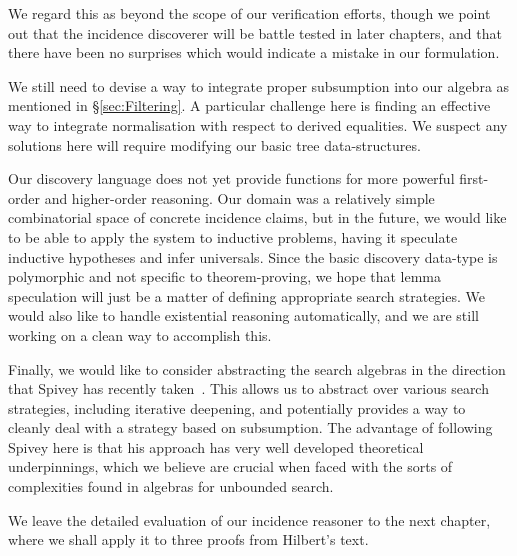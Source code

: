 We regard this as beyond the scope of our verification efforts, though we point out that the incidence discoverer will be battle tested in later chapters, and that there have been no surprises which would indicate a mistake in our formulation.

We still need to devise a way to integrate proper subsumption into our algebra as mentioned in \S\ref{sec:Filtering}. A particular challenge here is finding an effective way to integrate normalisation with respect to derived equalities. We suspect any solutions here will require modifying our basic tree data-structures. 

Our discovery language does not yet provide functions for more powerful first-order and higher-order reasoning. Our domain was a relatively simple combinatorial space of concrete incidence claims, but in the future, we would like to be able to apply the system to inductive problems, having it speculate inductive hypotheses and infer universals. Since the basic discovery data-type is polymorphic and not specific to theorem-proving, we hope that lemma speculation will just be a matter of defining appropriate search strategies. We would also like to handle existential reasoning automatically, and we are still working on a clean way to accomplish this. 

Finally, we would like to consider abstracting the search algebras in the direction that Spivey has recently taken~\cite{SearchAlgebras}. This allows us to abstract over various search strategies, including iterative deepening, and potentially provides a way to cleanly deal with a strategy based on subsumption. The advantage of following Spivey here is that his approach has very well developed theoretical underpinnings, which we believe are crucial when faced with the sorts of complexities found in algebras for unbounded search.

We leave the detailed evaluation of our incidence reasoner to the next chapter, where we shall apply it to three proofs from Hilbert's text.
